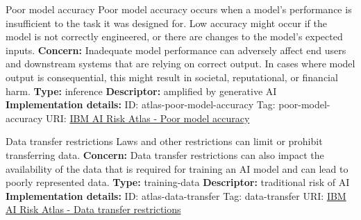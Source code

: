 \begin{definitionbox}{Poor model accuracy}
Poor model accuracy occurs when a model's performance is insufficient to the task it was designed for. Low accuracy might occur if the model is not correctly engineered, or there are changes to the model's expected inputs.\newline\newline
\textbf{Concern: }Inadequate model performance can adversely affect end users and downstream systems that are relying on correct output. In cases where model output is consequential, this might result in societal, reputational, or financial harm.\newline\newline
\textbf{Type: }inference\newline
\textbf{Descriptor: }amplified by generative AI \newline\newline
\textbf{Implementation details: } \newline
ID: atlas-poor-model-accuracy \newline
Tag: poor-model-accuracy \newline
URI:  \href{https://www.ibm.com/docs/en/watsonx/saas?topic=SSYOK8/wsj/ai-risk-atlas/poor-model-accuracy.html}{IBM AI Risk Atlas - Poor model accuracy}\newline
\end{definitionbox}
\begin{definitionbox}{Data transfer restrictions}
Laws and other restrictions can limit or prohibit transferring data.\newline\newline
\textbf{Concern: }Data transfer restrictions can also impact the availability of the data that is required for training an AI model and can lead to poorly represented data.\newline\newline
\textbf{Type: }training-data\newline
\textbf{Descriptor: }traditional risk of AI \newline\newline
\textbf{Implementation details: } \newline
ID: atlas-data-transfer \newline
Tag: data-transfer \newline
URI:  \href{https://www.ibm.com/docs/en/watsonx/saas?topic=SSYOK8/wsj/ai-risk-atlas/data-transfer.html}{IBM AI Risk Atlas - Data transfer restrictions}\newline
\end{definitionbox}

